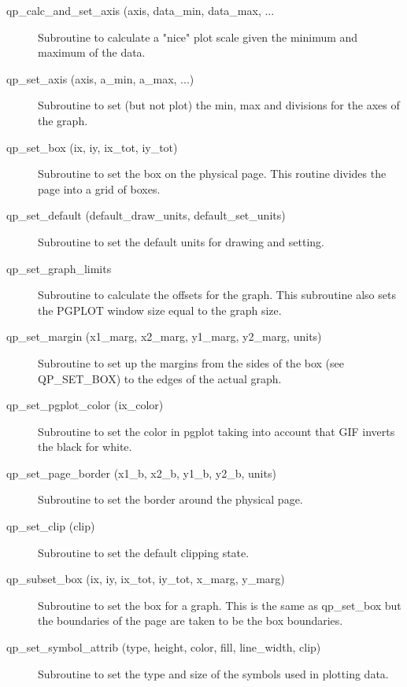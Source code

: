 \begin{description}

\item[qp\_calc\_and\_set\_axis (axis, data\_min, data\_max, ... ] \Newline
     Subroutine to calculate a "nice" plot scale given the minimum and maximum
     of the data. 

\item[qp\_set\_axis (axis, a\_min, a\_max, ...)] \Newline
    Subroutine to set (but not plot) the min, max and divisions for the axes of the graph.

\item[qp\_set\_box (ix, iy, ix\_tot, iy\_tot) ] \Newline 
     Subroutine to set the box on the physical page.
     This routine divides the page into a grid of boxes. 

\item[qp\_set\_default (default\_draw\_units, default\_set\_units)] \Newline 
     Subroutine to set the default units for drawing and setting.

\item[qp\_set\_graph\_limits] \Newline 
     Subroutine to calculate the offsets for the graph.
     This subroutine also sets the PGPLOT window size equal to the graph size.

\item[qp\_set\_margin (x1\_marg, x2\_marg, y1\_marg, y2\_marg, units)] \Newline 
     Subroutine to set up the margins from the sides of the box (see QP\_SET\_BOX)
     to the edges of the actual graph.

\item[qp\_set\_pgplot\_color (ix\_color) ] \Newline 
     Subroutine to set the color in pgplot taking into account that GIF
     inverts the black for white.

\item[qp\_set\_page\_border (x1\_b, x2\_b, y1\_b, y2\_b, units)] \Newline 
     Subroutine to set the border around the physical page.

\item[qp\_set\_clip (clip)] \Newline 
     Subroutine to set the default clipping state.

\item[qp\_subset\_box (ix, iy, ix\_tot, iy\_tot, x\_marg, y\_marg)] \Newline 
     Subroutine to set the box for a graph. This is the same as
     qp\_set\_box but the boundaries of the page are taken to be the box boundaries.

\item[qp\_set\_symbol\_attrib (type, height, color, fill, line\_width, clip)] \Newline 
     Subroutine to set the type and size of the symbols used in plotting data.


\end{description}
